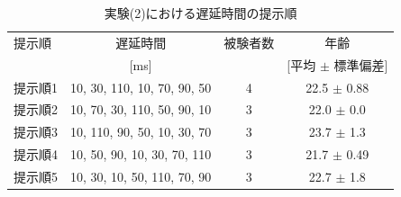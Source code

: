 \begin{table}[tbp]
  \caption{実験(2)における遅延時間の提示順}
  \label{table:B_delay_time}
  \centering
  \begin{tabular}{lccc}
    \hline
    提示順 & 遅延時間 & 被験者数 & 年齢\\
    　& [ms] & & [平均 $\pm$ 標準偏差]\\
    \hline \hline
    提示順1  & 10, 30, 110, 10, 70, 90, 50  & 4 & 22.5 $\pm$ 0.88\\
    提示順2  & 10, 70, 30, 110, 50, 90, 10  & 3 & 22.0 $\pm$ 0.0\\
    提示順3  & 10, 110, 90, 50, 10, 30, 70  & 3 & 23.7 $\pm$ 1.3\\
    提示順4  & 10, 50, 90, 10, 30, 70, 110  & 3 & 21.7 $\pm$ 0.49\\
    提示順5  & 10, 30, 10, 50, 110, 70, 90  & 3 & 22.7 $\pm$ 1.8
\\
    \hline
  \end{tabular}
\end{table}
